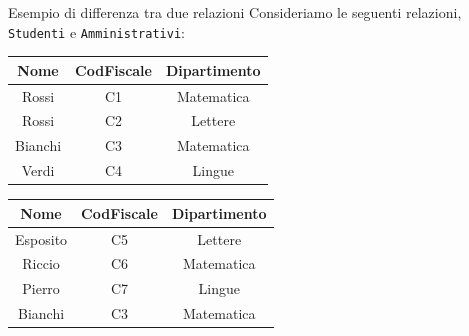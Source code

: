\documentclass[12pt]{report}
\begin{document}
	\begin{esempio}{Esempio di differenza tra due relazioni}{}
		Consideriamo le seguenti relazioni, \texttt{Studenti} e \texttt{Amministrativi}:\\
		\begin{minipage}[t]{0.48\textwidth}
			\vspace{0.1em}
			\centering
			\renewcommand{\arraystretch}{1.3}
			\begin{tabular}{|c|c|c|}
				\hline
				\rowcolor{BrickRed!60!white}
				Nome & CodFiscale & Dipartimento \\
				\hline
				Rossi   & C1 & Matematica \\
				Rossi   & C2 & Lettere    \\
				Bianchi & C3 & Matematica \\
				Verdi   & C4 & Lingue     \\
				\hline
			\end{tabular}
		\end{minipage}\hfill
		\begin{minipage}[t]{0.48\textwidth}
			\vspace{0.1em}
			\centering
			\renewcommand{\arraystretch}{1.3}
			\begin{tabular}{|c|c|c|}
				\hline
				\rowcolor{BrickRed!60!white}
				Nome & CodFiscale & Dipartimento \\
				\hline
				Esposito & C5 & Lettere    \\
				Riccio   & C6 & Matematica \\
				Pierro   & C7 & Lingue     \\
				Bianchi  & C3 & Matematica \\
				\hline
			\end{tabular}
		\end{minipage}
		

\end{esempio}
\end{document}
